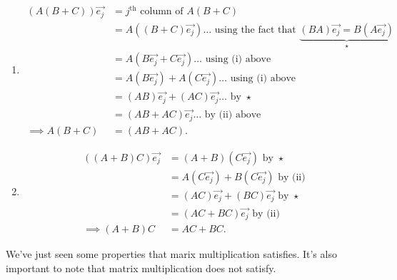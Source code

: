 \documentclass{report}
\begin{document}
            
  \begin{enumerate}[label=(\roman*)]
    \item 
      \begin{align*}
        \left( A \left( B+C \right)  \right) \vec{ e_j} &= j ^{ \text{th}} \text{ column of } A \left( B+C \right) \\
        &= A \left(  \left( B+C \right)  \vec{ e_j}  \right) \ldots \text{ using the fact that } \underbrace{ \left( BA \right) \vec{ e_j} =B \left( A \vec{ e_j}  \right)  }_{ \star }\\
        &= A \left( B \vec{ e_j} + C \vec{ e_j}  \right) \ldots \text{ using (i) above}\\
        &= A \left( B \vec{ e_j}  \right) + A \left( C \vec{ e_j}  \right) \ldots \text{ using (i) above}\\
        &= \left( AB \right) \vec{ e_j} + \left( AC \right) \vec{ e_j} \ldots \text{ by } \star\\
        &= \left( AB + AC \right) \vec{ e_j} \ldots \text{ by (ii) above}\\
        \implies A \left( B+C \right)  &= \left( AB + AC \right) 
      .\end{align*}
    \item  
      \begin{align*}
        \left( \left( A+B \right) C \right) \vec{ e_j} &= \left( A+B \right) \left( C \vec{ e_j}  \right) \text{ by } \star\\
        &= A \left( C \vec{ e_j}  \right) + B \left( C \vec{ e_j}  \right) \text{ by (ii)} \\
        &= \left( AC \right) \vec{ e_j} + \left( BC \right) \vec{ e_j} \text{ by } \star\\
        &= \left( AC + BC \right) \vec{ e_j} \text{ by (ii)}\\
        \implies \left( A+B \right) C &= AC + BC
      .\end{align*}
    \end{enumerate}
    We've just seen some properties that marix multiplication satisfies. It's also important to note that matrix multiplication does not satisfy.
\end{document}
